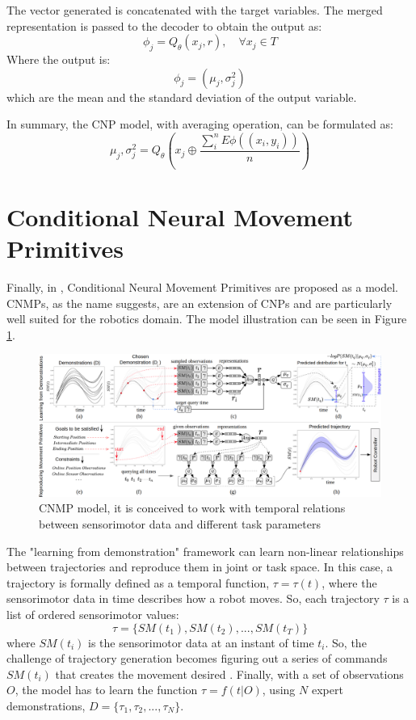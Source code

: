The vector generated is concatenated with the target variables. The merged representation is passed to the decoder to obtain the output as:
\begin{equation}
    \phi_j = Q_\theta(x_j, r), \quad \forall x_j \in T
\end{equation}
Where the output is: 
\begin{equation}
    \phi_j = (\mu_j, \sigma_j^2)
\end{equation}
which are the mean and the standard deviation of the output variable.

In summary, the CNP model, with averaging operation, can be formulated as: 
\begin{equation}
    \mu_j, \sigma_j^2 = Q_\theta \left( x_j \oplus \frac{ \sum_{i}^{n} E\phi((x_i,y_i)) }{n}  \right)
\end{equation}

\section{Conditional Neural Movement Primitives}
Finally, in \cite{Ugur-RSS-19}, Conditional Neural Movement Primitives are proposed as a model. CNMPs, as the name suggests, are an extension of CNPs and are particularly well suited for the robotics domain. The model illustration can be seen in Figure \ref{fig:cnmp}.  
\begin{figure}
	\centering
	\includegraphics[width=0.99\linewidth]{Images/CNMP.png}
	\caption{CNMP model, it is conceived to work with temporal relations between sensorimotor data and different task parameters}
	\label{fig:cnmp}
\end{figure}
The "learning from demonstration" framework can learn non-linear relationships between trajectories and reproduce them in joint or task space. In this case, a trajectory is formally defined as a temporal function, $\tau = \tau (t)$, where the sensorimotor data in time describes how a robot moves. So, each trajectory $\tau$ is a list of ordered sensorimotor values: 
\begin{equation}
    \tau = \{ SM(t_1), SM(t_2), ... , SM(t_T ) \}
\end{equation}
where $SM(t_i)$ is the sensorimotor data at an instant of time $t_i$.
So, the challenge of trajectory generation becomes figuring out a series of commands $SM(t_i)$ that creates the movement desired \cite{gasparetto2007new}. 
Finally, with a set of observations $O$, the model has to learn the function $\tau = f(t|O)$, using $N$ expert demonstrations, $D = \{\tau_1, \tau_2, ... , \tau_N \}$. 

